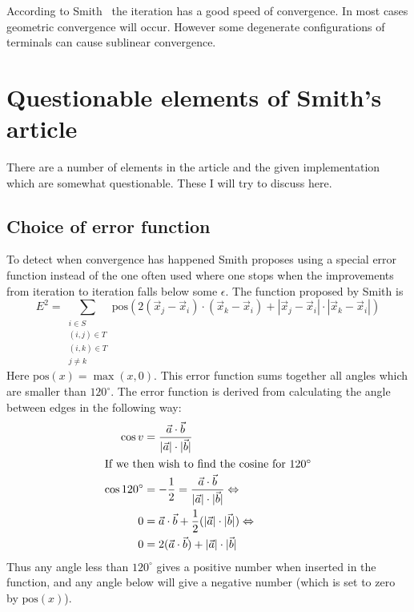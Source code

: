According to Smith~\cite[p.~150]{Smith1992} the iteration has a good speed of
convergence. In most cases geometric convergence will occur. However some
degenerate configurations of terminals can cause sublinear convergence.


\section{Questionable elements of Smith's article}
\label{sec:quest-elem-smiths}

There are a number of elements in the article and the given
implementation~\cite{Smith1992} which are somewhat questionable.  These I will
try to discuss here.

\subsection{Choice of error function}
\label{sec:choice-error-funct}

To detect when convergence has happened Smith proposes using a special
error function instead of the one often used where one stops when the
improvements from iteration to iteration falls below some $\epsilon$.  The
function proposed by Smith is
%
\begin{equation}
  \label{eq:1} E^2 = \sum_{
    \begin{array}{c} i \in S \\ (i,j) \in T \\ (i,k) \in T \\ j \ne k
    \end{array}} \text{pos} (2 (\vec x_j - \vec x_i) \cdot (\vec x_k - \vec x_i)
+ | \vec x_j - \vec x_i | \cdot | \vec x_k - \vec x_i |)
\end{equation}
%
Here $\text{pos}(x) = \max(x, 0)$.  This error function sums together all angles which
are smaller than $120^{\circ}$.  The error function is derived from calculating
the angle between edges in the following way:
%
\begin{align}
  \cos v & = \frac{\vec a \cdot \vec b}
    {|\vec a| \cdot |\vec b|} \label{eq:2}                 \\
  \intertext{If we then wish to find the cosine for $120^{\circ}$}
  \cos 120^{\circ}
         & = -\frac{1}{2} = \frac{\vec a \cdot \vec b}
    {|\vec a| \cdot |\vec b|} \Leftrightarrow \label{eq:3} \\
  0      & = \vec a \cdot \vec b + \frac{1}{2}
    (|\vec a| \cdot |\vec b|) \Leftrightarrow \label{eq:4} \\
  0      & = 2 (\vec a \cdot \vec b) + |\vec a| \cdot |\vec b| \label{eq:5}
\end{align}
%
Thus any angle less than $120^{\circ}$ gives a positive number when inserted in
the function, and any angle below will give a negative number (which is set to
zero by $\text{pos}(x)$).


